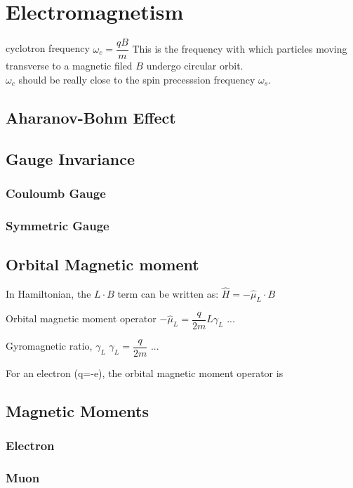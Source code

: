 \documentclass[12pt,a4paper]{article}
\begin{document}
\section{Electromagnetism}
\begin{definition}
    {cyclotron frequency}
    {$\omega_c= \dfrac{qB}{m}$}
    {
    This is the frequency with which particles moving transverse to a magnetic filed $B$ undergo circular orbit.\\
    $\omega_c$ should be really close to the spin precesssion frequency $\omega_s$.
    }
\end{definition}
\subsection{Aharanov-Bohm Effect}
\subsection{Gauge Invariance}
\subsubsection{Couloumb Gauge}
\subsubsection{Symmetric Gauge}
\subsection{Orbital Magnetic moment}
In Hamiltonian, the $L\cdot B$ term can be written as:
$\hat{H} = - \hat{\mu}_L\cdot B$
\begin{definition}
    {Orbital magnetic moment operator}
    {$- \hat{\mu}_L = \dfrac{q}{2m}\hat{L} \gamma_L$}
    {...}
\end{definition}
\begin{definition}
    {Gyromagnetic ratio, $\gamma_L$}
    {$\gamma_L = \dfrac{q}{2m}$}
    {...}
\end{definition}
For an electron (q=-e), the orbital magnetic moment operator is 
\subsection{Magnetic Moments}
\subsubsection{Electron}
\subsubsection{Muon}
\end{document}
